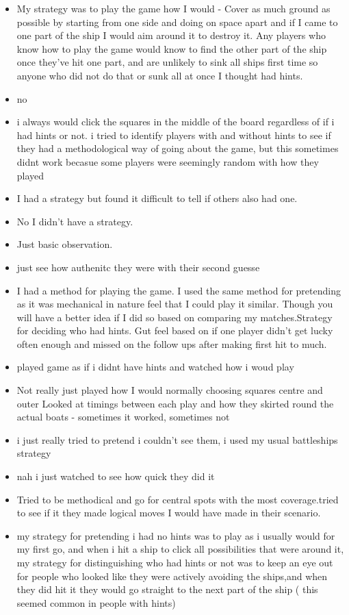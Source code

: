 \documentclass[
  english,
  man]{apa6}
\begin{document}
\begin{itemize}
\item
  My strategy was to play the game how I would - Cover as much ground as possible by starting from one side and doing on space apart and if I came to one part of the ship I would aim around it to destroy it. Any players who know how to play the game would know to find the other part of the ship once they've hit one part, and are unlikely to sink all ships first time so anyone who did not do that or sunk all at once I thought had hints.
\item
  no
\item
  i always would click the squares in the middle of the board regardless of if i had hints or not. i tried to identify players with and without hints to see if they had a methodological way of going about the game, but this sometimes didnt work becasue some players were seemingly random with how they played
\item
  I had a strategy but found it difficult to tell if others also had one.
\item
  No I didn't have a strategy.
\item
  Just basic observation.
\item
  just see how authenitc they were with their second guesse
\item
  I had a method for playing the game. I used the same method for pretending as it was mechanical in nature feel that I could play it similar. Though you will have a better idea if I did so based on comparing my matches.Strategy for deciding who had hints. Gut feel based on if one player didn't get lucky often enough and missed on the follow ups after making first hit to much.
\item
  played game as if i didnt have hints and watched how i woud play
\item
  Not really just played how I would normally choosing squares centre and outer Looked at timings between each play and how they skirted round the actual boats - sometimes it worked, sometimes not
\item
  i just really tried to pretend i couldn't see them, i used my usual battleships strategy
\item
  nah i just watched to see how quick they did it
\item
  Tried to be methodical and go for central spots with the most coverage.tried to see if it they made logical moves I would have made in their scenario.
\item
  my strategy for pretending i had no hints was to play as i usually would for my first go, and when i hit a ship to click all possibilities that were around it, my strategy for distinguishing who had hints or not was to keep an eye out for people who looked like they were actively avoiding the ships,and when they did hit it they would go straight to the next part of the ship ( this seemed common in people with hints)
\end{itemize}
\end{document}
